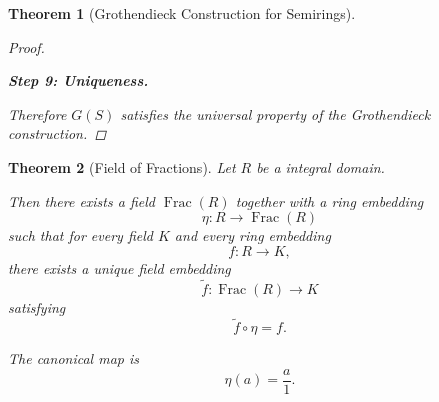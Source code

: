 \documentclass[10pt,a4paper]{book}
\newtheorem{theorem}{Theorem}[section]
\begin{document}
\begin{theorem}[Grothendieck Construction for Semirings]
\begin{proof}
\begin{fitchproof}[arrayenv=tabular]

        \end{fitchproof}

        \textbf{Step 9: Uniqueness.}

        \begin{fitchproof}[arrayenv=tabular]




        \end{fitchproof}

        Therefore $G(S)$ satisfies the universal property of the Grothendieck
        construction.

    \end{proof}

\end{theorem}

\begin{theorem}[Field of Fractions]
    Let $R$ be a  integral domain.

    Then there exists a field $\operatorname{Frac}(R)$ together with a ring
    embedding
    \[
        \eta : R \longrightarrow \operatorname{Frac}(R)
    \]
    such that for every field $K$ and every ring embedding
    \[
        f : R \to K,
    \]
    there exists a unique field embedding
    \[
        \tilde{f} : \operatorname{Frac}(R) \to K
    \]
    satisfying
    \[
        \tilde{f} \circ \eta = f.
    \]

    The canonical map is
    \[
        \eta(a) = \frac{a}{1}.
    \]
\end{theorem}
\end{document}
